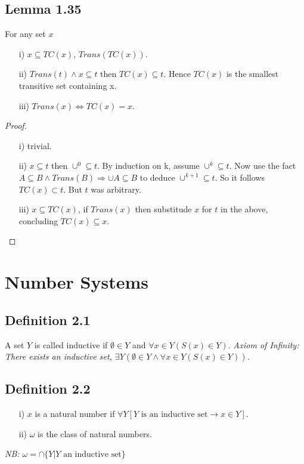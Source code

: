 \documentclass[a4paper, 12pt, twoside]{article}
\begin{document}
\subsection*{Lemma 1.35}
For any set $x$
\begin{itemize}
    \item[i)] $x\subseteq TC(x)$, $Trans(TC(x))$.
    \item[ii)] $Trans(t)\wedge x\subseteq t$ then $TC(x)\subseteq t$. Hence $TC(x)$ is the smallest transitive set containing x.
    \item[iii)] $Trans(x)\iff TC(x)=x$.
\end{itemize}
\begin{proof}
    \begin{itemize}
        \item[i)] trivial.
        \item[ii)] $x\subseteq t$ then $\cup^{0}\subseteq t$. By induction on k, assume $\cup^{k}\subseteq t$. Now use the fact $A\subseteq B \wedge Trans(B)\Rightarrow \cup A\subseteq B$ to deduce $\cup^{k+1}\subseteq t$. So it follows $TC(x)\subset t$. But $t$ was arbitrary.
        \item[iii)] $x\subseteq TC(x)$, if $Trans(x)$ then substitude $x$ for $t$ in the above, concluding $TC(x)\subseteq x$.
    \end{itemize}
\end{proof}

\section{Number Systems}
\subsection*{Definition 2.1}
A set $Y$ is called inductive if $\emptyset \in Y$ and $\forall x\in Y (S(x)\in Y)$.
\textit{Axiom of Infinity: There exists an inductive set, $\exists Y(\emptyset\in Y \wedge \forall x\in Y (S(x)\in Y))$.}
\subsection*{Definition 2.2}
\begin{itemize}
    \item[i)] $x$ is a natural number if $\forall Y[Y\text{ is an inductive set}\to x\in Y]$.
    \item[ii)] $\omega$ is the class of natural numbers.
\end{itemize}
\textit{NB: $\omega=\cap\{Y|Y\text{ an inductive set}\}$}
\end{document}
